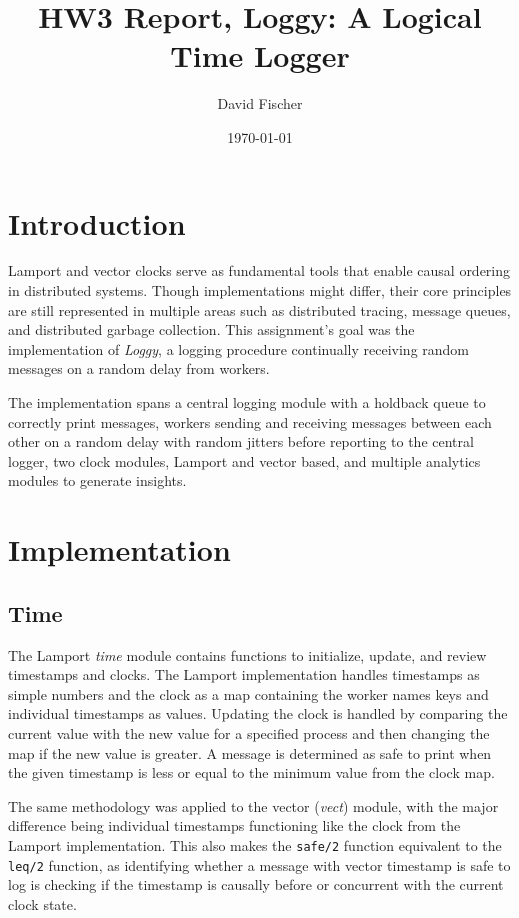 \documentclass[a4paper, 11pt]{article}
\title{HW3 Report, Loggy: A Logical Time Logger}
\author{David Fischer}
\date{\today{}}
\begin{document}
\maketitle

\section{Introduction}
Lamport and vector clocks serve as fundamental tools that enable causal ordering in distributed systems. Though implementations might differ, their core principles are still represented in multiple areas such as distributed tracing, message queues, and distributed garbage collection.
This assignment's goal was the implementation of \textit{Loggy}, a logging procedure continually receiving random messages on a random delay from workers.

The implementation spans a central logging module with a holdback queue to correctly print messages, workers sending and receiving messages between each other on a random delay with random jitters before reporting to the central logger, two clock modules, Lamport and vector based, and multiple analytics modules to generate insights.

\section{Implementation}

\subsection{Time}

The Lamport \textit{time} module contains functions to initialize, update, and review timestamps and clocks.
The Lamport implementation handles timestamps as simple numbers and the clock as a map containing the worker names keys and individual timestamps as values.
Updating the clock is handled by comparing the current value with the new value for a specified process and then changing the map if the new value is greater.
A message is determined as safe to print when the given timestamp is less or equal to the minimum value from the clock map.

The same methodology was applied to the vector (\textit{vect}) module, with the major difference being individual timestamps functioning like the clock from the Lamport implementation. This also makes the \texttt{safe/2} function equivalent to the \texttt{leq/2} function, as identifying whether a message with vector timestamp is safe to log is checking if the timestamp is causally before or concurrent with the current clock state.
\end{document}
